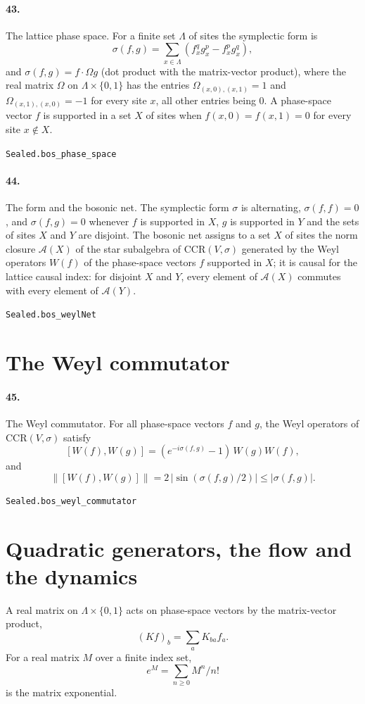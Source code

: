 \documentclass[11pt]{article}
\begin{document}
\paragraph{43.} The lattice phase space. For a finite set $\Lambda$ of sites the symplectic form is \[\sigma(f, g) = \sum_{x \in \Lambda} (f^q_x g^p_x - f^p_x g^q_x),\] and $\sigma(f, g) = f \cdot \Omega g$ (dot product with the matrix-vector product), where the real matrix $\Omega$ on $\Lambda \times \{0, 1\}$ has the entries $\Omega_{(x, 0), (x, 1)} = 1$ and $\Omega_{(x, 1), (x, 0)} = -1$ for every site $x$, all other entries being $0$. A phase-space vector $f$ is supported in a set $X$ of sites when $f(x, 0) = f(x, 1) = 0$ for every site $x \notin X$.\par{\footnotesize\texttt{Sealed.bos\_phase\_space}}

\paragraph{44.} The form and the bosonic net. The symplectic form $\sigma$ is alternating, $\sigma(f, f) = 0$, and $\sigma(f, g) = 0$ whenever $f$ is supported in $X$, $g$ is supported in $Y$ and the sets of sites $X$ and $Y$ are disjoint. The bosonic net assigns to a set $X$ of sites the norm closure $\mathcal A(X)$ of the star subalgebra of $\mathrm{CCR}(V, \sigma)$ generated by the Weyl operators $W(f)$ of the phase-space vectors $f$ supported in $X$; it is causal for the lattice causal index: for disjoint $X$ and $Y$, every element of $\mathcal A(X)$ commutes with every element of $\mathcal A(Y)$.\par{\footnotesize\texttt{Sealed.bos\_weylNet}}

\section*{The Weyl commutator}
\paragraph{45.} The Weyl commutator. For all phase-space vectors $f$ and $g$, the Weyl operators of $\mathrm{CCR}(V, \sigma)$ satisfy \[[W(f), W(g)] = (e^{-i\sigma(f, g)} - 1)\, W(g) W(f),\] and \[\|[W(f), W(g)]\| = 2\, |\sin(\sigma(f, g)/2)| \le |\sigma(f, g)|.\]\par{\footnotesize\texttt{Sealed.bos\_weyl\_commutator}}

\section*{Quadratic generators, the flow and the dynamics}
A real matrix on $\Lambda \times \{0, 1\}$ acts on phase-space vectors by the matrix-vector product, \[(K f)_b = \sum_a K_{ba} f_a.\] For a real matrix $M$ over a finite index set, \[e^{M} = \sum_{n \ge 0} M^n / n!\] is the matrix exponential.
\end{document}
